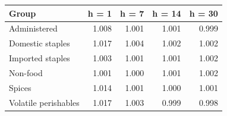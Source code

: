 \begin{tabular}{lrrrr}
\toprule
\textbf{Group} & \textbf{h = 1} & \textbf{h = 7} & \textbf{h = 14} & \textbf{h = 30} \\
\midrule
Administered & 1.008 & 1.001 & 1.001 & 0.999 \\
Domestic staples & 1.017 & 1.004 & 1.002 & 1.002 \\
Imported staples & 1.003 & 1.001 & 1.001 & 1.002 \\
Non-food & 1.001 & 1.000 & 1.001 & 1.002 \\
Spices & 1.014 & 1.001 & 1.000 & 1.001 \\
Volatile perishables & 1.017 & 1.003 & 0.999 & 0.998 \\
\bottomrule
\end{tabular}
